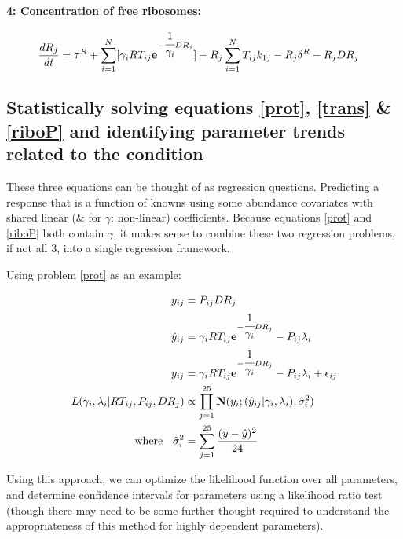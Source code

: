 \documentclass[12pt]{article}
\begin{document}
\vspace{2cm}
\textbf{4: Concentration of free ribosomes:}

\begin{align}
\frac{dR_{j}}{dt} &= \tau^{R} + \sum_{i = 1}^{N}[\gamma_{i}RT_{ij}\textbf{e}^{-\cfrac{1}{\gamma_{i}}DR_{j}}] - R_{j}\sum_{i = 1}^{N}T_{ij}k_{1j} - R_{j}\delta^{R} - R_{j}DR_{j}
\end{align}

\clearpage
\subsection*{Statistically solving equations \ref{prot}, \ref{trans} \& \ref{riboP} and identifying parameter trends related to the condition}

These three equations can be thought of as regression questions.  Predicting a response that is a function of knowns using some abundance covariates with shared linear (\& for $\gamma$: non-linear) coefficients.  Because equations \ref{prot} and \ref{riboP} both contain $\gamma$, it makes sense to combine these two regression problems, if not all 3, into a single regression framework.

Using problem \ref{prot} as an example:

\begin{align}
y_{ij} &= P_{ij}DR_{j}\notag\\
\hat{y}_{ij} &= \gamma_{i}RT_{ij}\textbf{e}^{-\cfrac{1}{\gamma_{i}}DR_{j}} - P_{ij}\lambda_{i}\notag\\
y_{ij} &= \gamma_{i}RT_{ij}\textbf{e}^{-\cfrac{1}{\gamma_{i}}DR_{j}} - P_{ij}\lambda_{i} + \epsilon_{ij}\\
L(\gamma_{i}, \lambda_{i} | RT_{ij}, P_{ij}, DR_{j}) &\propto \prod_{j = 1}^{25}\textbf{N}(y_{i}; (\hat{y}_{ij}|\gamma_{i}, \lambda_{i}), \hat{\sigma}^{2}_{i})\\
\text{where \hspace{2mm}} \hat{\sigma}^{2}_{i} &= \sum_{j = 1}^{25}\frac{(y - \hat{y})^{2}}{24}
\end{align}

Using this approach, we can optimize the likelihood function over all parameters, and determine confidence intervals for parameters using a likelihood ratio test (though there may need to be some further thought required to understand the appropriateness of this method for highly dependent parameters).
\end{document}
